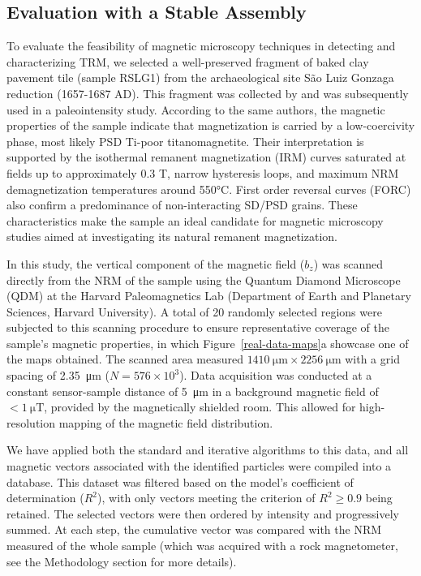 \subsection{Evaluation with a Stable Assembly}

To evaluate the feasibility of magnetic microscopy techniques in detecting and characterizing TRM, we selected a well-preserved fragment of baked clay pavement tile (sample RSLG1) from the archaeological site São Luiz Gonzaga reduction (1657-1687 AD). This fragment was collected by \citet{Poletti2016} and was subsequently used in a paleointensity study. According to the same authors, the magnetic properties of the sample indicate that magnetization is carried by a low-coercivity phase, most likely PSD Ti-poor titanomagnetite. Their interpretation is supported by the isothermal remanent magnetization (IRM) curves saturated at fields up to approximately 0.3 T, narrow hysteresis loops, and maximum NRM demagnetization temperatures around 550°C. First order reversal curves (FORC) also confirm a predominance of non-interacting SD/PSD grains. These characteristics make the sample an ideal candidate for magnetic microscopy studies aimed at investigating its natural remanent magnetization.

In this study, the vertical component of the magnetic field ($b_z$) was scanned directly from the NRM of the sample using the Quantum Diamond Microscope (QDM) at the Harvard Paleomagnetics Lab (Department of Earth and Planetary Sciences, Harvard University). A total of 20 randomly selected regions were subjected to this scanning procedure to ensure representative coverage of the sample's magnetic properties, in which Figure~\ref{real-data-maps}a showcase one of the maps obtained. The scanned area measured $\qty{1410}{\um} \times \qty{2256}{\um}$ with a grid spacing of \qty{2.35}{\um} ($N = 576 \times 10^{3}$). Data acquisition was conducted at a constant sensor-sample distance of \qty{5}{\um} in a background magnetic field of $< \qty{1}{\micro\tesla}$, provided by the magnetically shielded room. This allowed for high-resolution mapping of the magnetic field distribution.

We have applied both the standard and iterative algorithms to this data, and all magnetic vectors associated with the identified particles were compiled into a database. This dataset was filtered based on the model's coefficient of determination ($R^2$), with only vectors meeting the criterion of $R^2 \geq 0.9$ being retained. The selected vectors were then ordered by intensity and progressively summed. At each step, the cumulative vector was compared with the NRM measured of the whole sample (which was acquired with a rock magnetometer, see the Methodology section for more details).


